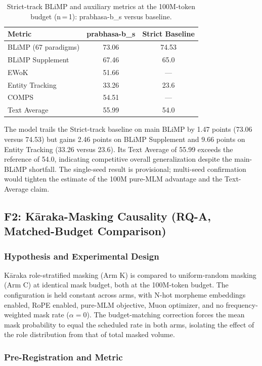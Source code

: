 \begin{table}[t]
\centering
\caption{Strict-track BLiMP and auxiliary metrics at the 100M-token budget (n\,=\,1): prabhasa-b\_s versus baseline.}
\label{tab:strict_results}
{\small
\begin{tabular}{lcc}
\toprule
Metric & prabhasa-b\_s & Strict Baseline \\
\midrule
BLiMP (67 paradigms) & 73.06 & 74.53 \\
BLiMP Supplement & 67.46 & 65.0 \\
EWoK & 51.66 & — \\
Entity Tracking & 33.26 & 23.6 \\
COMPS & 54.51 & — \\
\midrule
Text Average & 55.99 & 54.0 \\
\bottomrule
\end{tabular}
}
\end{table}

The model trails the Strict-track baseline on main BLiMP by 1.47 points (73.06 versus 74.53) but gains 2.46 points on BLiMP Supplement and 9.66 points on Entity Tracking (33.26 versus 23.6). Its Text Average of 55.99 exceeds the reference of 54.0, indicating competitive overall generalization despite the main-BLiMP shortfall. The single-seed result is provisional; multi-seed confirmation would tighten the estimate of the 100M pure-MLM advantage and the Text-Average claim.

\subsection{F2: Kāraka-Masking Causality (RQ-A, Matched-Budget Comparison)}

\subsubsection{Hypothesis and Experimental Design}

Kāraka role-stratified masking (Arm K) is compared to uniform-random masking (Arm C) at identical mask budget, both at the 100M-token budget. The configuration is held constant across arms, with N-hot morpheme embeddings enabled, RoPE enabled, pure-MLM objective, Muon optimizer, and no frequency-weighted mask rate ($\alpha = 0$). The budget-matching correction forces the mean mask probability to equal the scheduled rate in both arms, isolating the effect of the role distribution from that of total masked volume.

\subsubsection{Pre-Registration and Metric}


